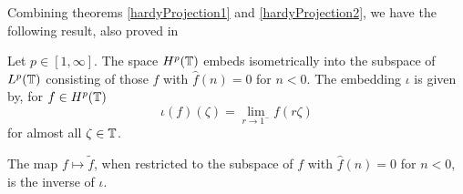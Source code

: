 Combining theorems \ref{hardyProjection1} and \ref{hardyProjection2}, we 
have the following result, also proved in \cite{katznelson}
\begin{theorem}
    Let $p \in [1,\infty]$. The space $H^p(\mathbb{T})$ embeds
    isometrically into the subspace of $L^p(\mathbb{T})$
    consisting of those $f$ with $\hat{f}(n) = 0$ for $n < 0$. The embedding $\iota$
    is given by, for $f \in H^p(\mathbb{T})$
    \begin{equation}
        \iota(f)(\zeta) = \lim_{r\to 1^-} f(r\zeta)
    \end{equation}
    for almost all $\zeta \in \mathbb{T}$.
    
    The map $f\mapsto \tilde{f}$, when restricted to the subspace
    of $f$ with $\hat{f}(n) = 0$ for $n < 0$, is the inverse of $\iota$.
\end{theorem}

